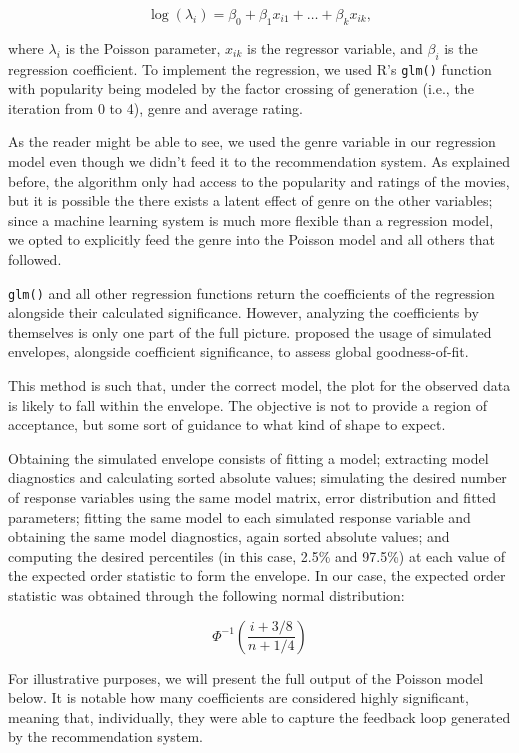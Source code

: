 $$
\log(\lambda_i) = \beta_0 + \beta_1 x_{i1} + \dots + \beta_k x_{ik},
$$

\noindent where $\lambda_i$ is the Poisson parameter, $x_{ik}$ is the regressor
variable, and $\beta_i$ is the regression coefficient. To implement the
regression, we used R's \verb|glm()| \citep{rcore_stats_2022} function with
popularity being modeled by the factor crossing of generation (i.e., the
iteration from 0 to 4), genre and average rating.

As the reader might be able to see, we used the genre variable in our regression
model even though we didn't feed it to the recommendation system. As explained
before, the algorithm only had access to the popularity and ratings of the
movies, but it is possible the there exists a latent effect of genre on the
other variables; since a machine learning system is much more flexible than a
regression model, we opted to explicitly feed the genre into the Poisson model
and all others that followed.

\verb|glm()| and all other regression functions return the coefficients of the
regression alongside their calculated significance. However, analyzing the
coefficients by themselves is only one part of the full picture.
\citet{atkinson_plots_1987} proposed the usage of simulated envelopes, alongside
coefficient significance, to assess global goodness-of-fit.

This method is such that, under the correct model, the plot for the observed
data is likely to fall within the envelope. The objective is not to provide a
region of acceptance, but some sort of guidance to what kind of shape to expect.

Obtaining the simulated envelope consists of fitting a model; extracting model
diagnostics and calculating sorted absolute values; simulating the desired
number of response variables using the same model matrix, error distribution and
fitted parameters; fitting the same model to each simulated response variable
and obtaining the same model diagnostics, again sorted absolute values; and
computing the desired percentiles (in this case, 2.5\% and 97.5\%) at each value
of the expected order statistic to form the envelope. In our case, the expected
order statistic was obtained through the following normal distribution:

$$
\Phi^{-1}(\frac{i+3/8}{n+1/4})
$$

For illustrative purposes, we will present the full output of the Poisson model
below. It is notable how many coefficients are considered highly significant,
meaning that, individually, they were able to capture the feedback loop
generated by the recommendation system.

